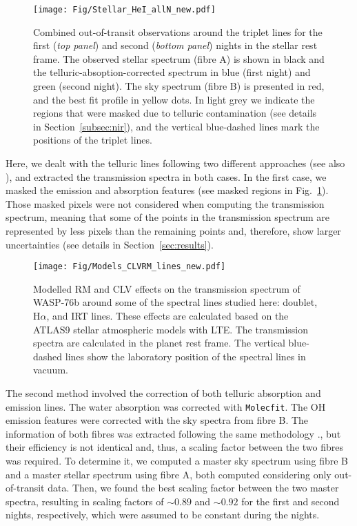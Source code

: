 \documentclass{aa}
\begin{document}
\begin{figure}[]
\centering
\texttt{[image: Fig/Stellar\_HeI\_allN\_new.pdf]}
\caption{Combined out-of-transit observations around the  triplet lines for the first ({\it top panel}) and second ({\it bottom panel}) nights in the stellar rest frame. The observed stellar spectrum (fibre A) is shown in black and the telluric-absoption-corrected spectrum in blue (first night) and green (second night). The sky spectrum (fibre B) is presented in red, and the best fit profile in yellow dots. In light grey we indicate the regions that were masked due to telluric contamination (see details in Section~\ref{subsec:nir}), and the vertical blue-dashed lines mark the positions of the  triplet lines.}
\label{fig:HeI_star}
\end{figure}


Here, we dealt with the telluric lines following two different approaches (see also \citealt{Palle2020a}), and extracted the transmission spectra in both cases. In the first case, we masked the emission and absorption features (see masked regions in
Fig.~\ref{fig:HeI_star}). Those masked pixels were not considered when computing the transmission spectrum, meaning that some of the points in the transmission spectrum are represented by less pixels than the remaining points and, therefore, show larger uncertainties (see details in Section~\ref{sec:results}).

\begin{figure*}[]
\centering
\texttt{[image: Fig/Models\_CLVRM\_lines\_new.pdf]}
\caption{Modelled RM and CLV effects on the transmission spectrum of WASP-76b around some of the spectral lines studied here:  doublet, H$\alpha$, and  IRT lines. These effects are calculated based on the ATLAS9 stellar atmospheric models with LTE. The transmission spectra are calculated in the planet rest frame. The vertical blue-dashed lines show the laboratory position of the spectral lines in vacuum. }
\label{fig:models}
\end{figure*}

The second method involved the correction of both telluric absorption and emission lines. The water absorption was corrected with {\tt Molecfit}. The OH emission features were corrected with the sky spectra from fibre B. The information of both fibres was extracted following the same methodology \citep[FOX,][]{Zechmeister2014}., but their efficiency is not identical and, thus, a scaling factor between the two fibres was required. To determine it, we computed a master sky spectrum using fibre B and a master stellar spectrum using fibre A, both computed considering only out-of-transit data. Then, we found the best scaling factor between the two master spectra, resulting in scaling factors of $\sim 0.89$ and $\sim 0.92$ for the first and second nights, respectively, which were assumed to be constant during the nights.
\end{document}
